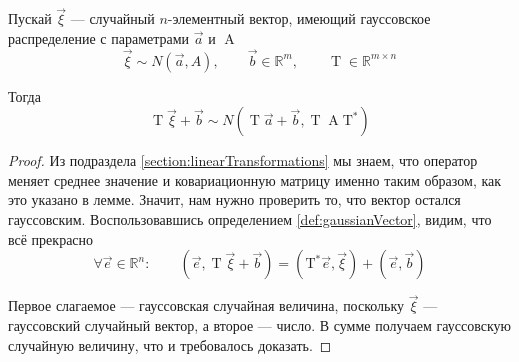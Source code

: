 \begin{lemma}\label{lemma:gaussMoved}
  Пускай $\vec{\xi}$ --- случайный $n$-элементный вектор, имеющий гауссовское
  распределение с параметрами $\vec{a}$ и $\operatorname{A}$
  \begin{equation*}
    \vec{\xi} \sim N\left( \vec{a}, A \right),\qquad
    \vec{b} \in \mathbb{R}^m,\qquad
    \operatorname{T} \in \mathbb{R}^{m \times n}
  \end{equation*}

  Тогда
  \begin{equation*}
    \operatorname{T} \vec{\xi} + \vec{b}
      \sim N\left( \operatorname{T}\vec{a} + \vec{b} ,
    \operatorname{T} \operatorname{A} \operatorname{T^*} \right)
  \end{equation*}
\end{lemma}
\begin{proof}
  Из подраздела \ref{section:linearTransformations} мы знаем, что оператор
  меняет среднее значение и ковариационную матрицу именно таким образом, как
  это указано в лемме. Значит, нам нужно проверить то, что вектор остался
  гауссовским. Воспользовавшись определением \ref{def:gaussianVector}, видим,
  что всё прекрасно
  \begin{equation*}
    \forall \vec{e} \in \mathbb{R}^n:\qquad
    \left( \vec{e}, \operatorname{T} \vec{\xi} + \vec{b} \right)
    = \left( \operatorname{T^*} \vec{e} , \vec{\xi} \right)
      + \left( \vec{e}, \vec{b} \right)
  \end{equation*}

  Первое слагаемое --- гауссовская случайная величина,
  поскольку $\vec{\xi}$ --- гауссовский случайный вектор,
  а второе --- число.
  В сумме получаем гауссовскую случайную величину, что и требовалось доказать.
\end{proof}

